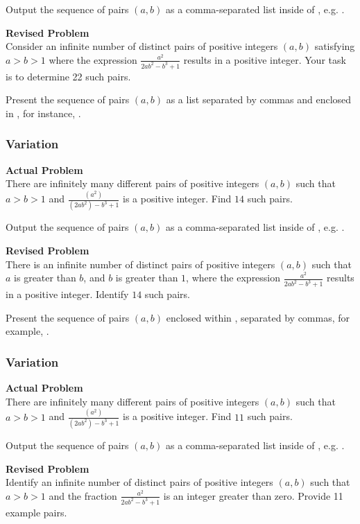 Output the sequence of pairs $(a,b)$ as a comma-separated list inside of \boxed, e.g. .

\textbf{Revised Problem}\\
Consider an infinite number of distinct pairs of positive integers $(a,b)$ satisfying $a > b > 1$ where the expression $\frac{a^2}{2ab^2 - b^3 + 1}$ results in a positive integer. Your task is to determine 22 such pairs.

Present the sequence of pairs $(a,b)$ as a list separated by commas and enclosed in \boxed, for instance, .

\subsubsection{Variation}
\textbf{Actual Problem}\\
There are infinitely many different pairs of positive integers $(a,b)$ such that $a>b>1$ and $\frac{(a^2)}{(2ab^2) - b^3 + 1}$ is a positive integer. Find $14$ such pairs.

Output the sequence of pairs $(a,b)$ as a comma-separated list inside of \boxed, e.g. .

\textbf{Revised Problem}\\
There is an infinite number of distinct pairs of positive integers $(a,b)$ such that $a$ is greater than $b$, and $b$ is greater than $1$, where the expression $\frac{a^2}{2ab^2 - b^3 + 1}$ results in a positive integer. Identify $14$ such pairs.

Present the sequence of pairs $(a,b)$ enclosed within \boxed, separated by commas, for example, .

\subsubsection{Variation}
\textbf{Actual Problem}\\
There are infinitely many different pairs of positive integers $(a,b)$ such that $a>b>1$ and $\frac{(a^2)}{(2ab^2) - b^3 + 1}$ is a positive integer. Find $11$ such pairs.

Output the sequence of pairs $(a,b)$ as a comma-separated list inside of \boxed, e.g. .

\textbf{Revised Problem}\\
Identify an infinite number of distinct pairs of positive integers \((a, b)\) such that \(a > b > 1\) and the fraction \(\frac{a^2}{2ab^2 - b^3 + 1}\) is an integer greater than zero. Provide 11 example pairs.

